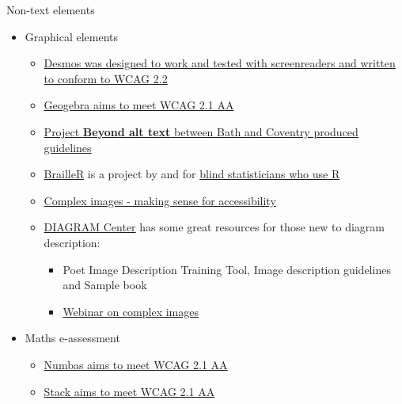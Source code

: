 \documentclass[
  ignorenonframetext,
]{beamer}
\providecommand{\tightlist}{%
  \setlength{\itemsep}{0pt}\setlength{\parskip}{0pt}}
\begin{document}
\begin{frame}{Non-text elements}
\label{non-text-elements}
\begin{itemize}
\tightlist
\item
  Graphical elements

  \begin{itemize}
  \tightlist
  \item
    \href{https://www.desmos.com/accessibility}{Desmos was designed to
    work and tested with screenreaders and written to conform to WCAG
    2.2}
  \item
    \href{https://www.geogebra.org/m/r2EF8uRx}{Geogebra aims to meet
    WCAG 2.1 AA}
  \item
    \href{https://bathmash.github.io/CETL-MSOR-2022-Beyond-alt-text/index.html}{Project
    \textbf{Beyond alt text} between Bath and Coventry produced
    guidelines}
  \item
    \href{https://github.com/ajrgodfrey/BrailleR}{BrailleR} is a project
    by and for \href{https://r-resources.massey.ac.nz/BrailleR/}{blind
    statisticians who use R}
  \item
    \href{https://www.learningapps.co.uk/moodle/xertetoolkits/play.php?template_id=3023\#page1}{Complex
    images - making sense for accessibility}
  \item
    \href{http://diagramcenter.org/}{DIAGRAM Center} has some great
    resources for those new to diagram description:

    \begin{itemize}
    \tightlist
    \item
      Poet Image Description Training Tool, Image description guidelines
      and Sample book
    \item
      \href{http://diagramcenter.org/diagramwebinars.html\#compleximages}{Webinar
      on complex images}
    \end{itemize}
  \end{itemize}
\item
  Maths e-assessment

  \begin{itemize}
  \tightlist
  \item
    \href{https://docs.numbas.org.uk/en/latest/accessibility/editor.html}{Numbas
    aims to meet WCAG 2.1 AA}
  \item
    \href{https://stack-assessment.org/Legal/Accessibility/}{Stack aims
    to meet WCAG 2.1 AA}
  \end{itemize}
\end{itemize}
\end{frame}
\end{document}
